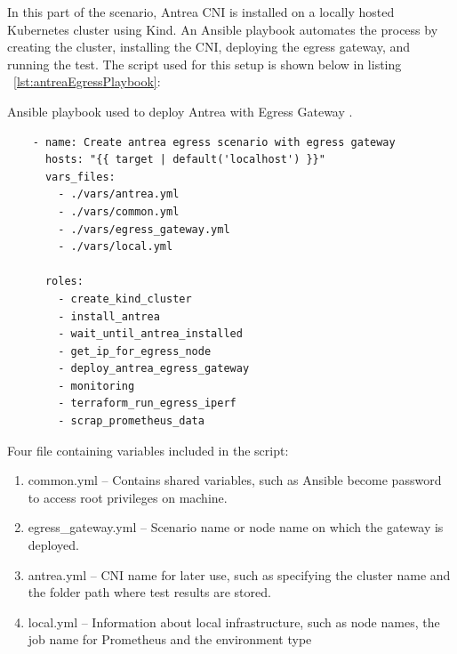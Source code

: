 
In this part of the scenario, Antrea CNI is installed on a locally hosted Kubernetes cluster using Kind. An Ansible playbook automates the process by creating the cluster, installing the CNI, deploying the egress gateway, and running the test. The script used for this setup is shown below in listing ~\ref{lst:antreaEgressPlaybook}:

\begin{listing}[H]
  \centering
  \caption{Ansible playbook used to deploy Antrea with Egress Gateway \cite{AnsibleDocs}.}
  \begin{verbatim}
    - name: Create antrea egress scenario with egress gateway
      hosts: "{{ target | default('localhost') }}"
      vars_files:
        - ./vars/antrea.yml
        - ./vars/common.yml
        - ./vars/egress_gateway.yml
        - ./vars/local.yml

      roles:
        - create_kind_cluster
        - install_antrea
        - wait_until_antrea_installed
        - get_ip_for_egress_node
        - deploy_antrea_egress_gateway
        - monitoring
        - terraform_run_egress_iperf
        - scrap_prometheus_data
  \end{verbatim}
  \label{lst:antreaEgressPlaybook}
\end{listing}

Four file containing variables included in the script:
\begin{enumerate}
  \item common.yml -- Contains shared variables, such as Ansible become password to access root privileges on machine.
  \item egress\_gateway.yml -- Scenario name or node name on which the gateway is deployed.
  \item antrea.yml -- CNI name for later use, such as specifying the cluster name and the folder path where test results are stored.
  \item local.yml -- Information about local infrastructure, such as node names, the job name for Prometheus and the environment type
\end{enumerate}

